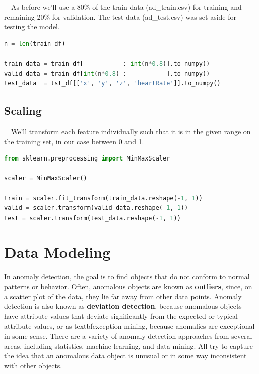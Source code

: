 ~~As before we'll use a 80\% of the train data (ad\_train.csv) for training and remaining 20\% for validation. The test data (ad\_test.csv) was set aside for testing the model.

\begin{lstlisting}[language=Python]
n = len(train_df)

train_data = train_df[           : int(n*0.8)].to_numpy()
valid_data = train_df[int(n*0.8) :           ].to_numpy()
test_data  = tst_df[['x', 'y', 'z', 'heartRate']].to_numpy()
\end{lstlisting}


\subsection*{Scaling}\label{Scaling}

~~We'll transform each feature individually such that it is in the given range on the training set, in our case between 0 and 1. 

\begin{lstlisting}[language=Python]
from sklearn.preprocessing import MinMaxScaler

scaler = MinMaxScaler()

train = scaler.fit_transform(train_data.reshape(-1, 1))
valid = scaler.transform(valid_data.reshape(-1, 1))
test = scaler.transform(test_data.reshape(-1, 1))
\end{lstlisting}




\section*{Data Modeling}\label{Data Modeling}

In anomaly detection, the goal is to ﬁnd objects that do not conform to normal patterns or behavior. Often, anomalous objects are known as \textbf{outliers}, since, on a scatter plot of the data, they lie far away from other data points. Anomaly detection is also known as \textbf{deviation detection}, because anomalous objects have attribute values that deviate signiﬁcantly from the expected or typical attribute values, or as textbf{exception mining}, because anomalies are exceptional in some sense. There are a variety of anomaly detection approaches from several areas, including statistics, machine learning, and data mining. All try to capture the idea that an anomalous data object is unusual or in some way inconsistent with other objects.

